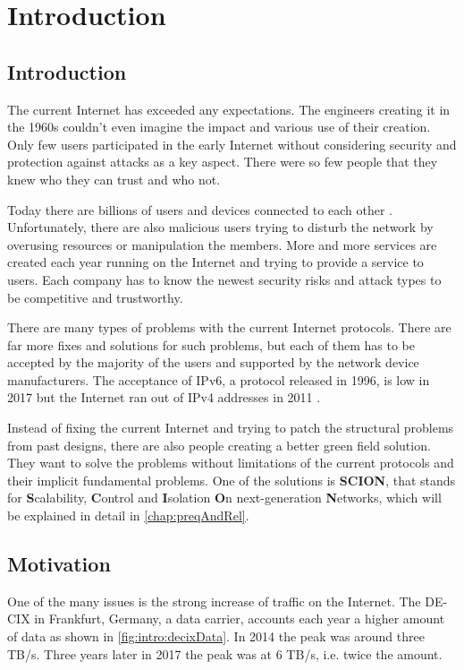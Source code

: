 \documentclass[thesis.tex]{subfiles}
\begin{document}
\chapter{Introduction}
\label{chap:introduction}


\section{Introduction}
The current Internet has exceeded any expectations. The engineers creating it in the 1960s couldn't even imagine the impact and various use of their creation. Only few users participated in the early Internet without considering security and protection against attacks as a key aspect. There were so few people that they knew who they can trust and who not.

Today there are billions of users and devices connected to each other \cite{MiniwattsMarketingGroup.31.12.2017}. Unfortunately, there are also malicious users trying to disturb the network by overusing resources or manipulation the members. More and more services are created each year running on the Internet and trying to provide a service to users. Each company has to know the newest security risks and attack types to be competitive and trustworthy. 

There are many types of problems with the current Internet protocols. There are far more fixes and solutions for such problems, but each of them has to be accepted by the majority of the users and supported by the network device manufacturers. The acceptance of IPv6, a protocol released in 1996, is low in 2017 but the Internet ran out of IPv4 addresses in 2011 \cite{ICANN.03.02.2011}.

Instead of fixing the current Internet and trying to patch the structural problems from past designs, there are also people creating a better green field solution. They want to solve the problems without limitations of the current protocols and their implicit fundamental problems. One of the solutions is \textbf{SCION}, that stands for \textbf{S}calability, \textbf{C}ontrol and \textbf{I}solation \textbf{O}n next-generation \textbf{N}etworks, which will be explained in detail in \autoref{chap:preqAndRel}.

\section{Motivation}
One of the many issues is the strong increase of traffic on the Internet. The DE-CIX in Frankfurt, Germany, a data carrier, accounts each year a higher amount of data as shown in \autoref{fig:intro:decixData}. In 2014 the peak was around three TB/s. Three years later in 2017 the peak was at 6 TB/s, i.e. twice the amount. 
\end{document}
